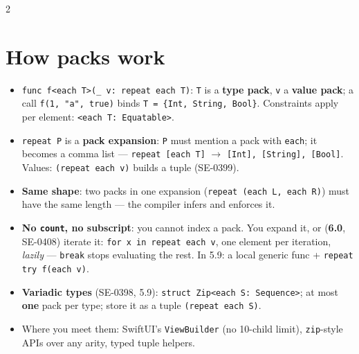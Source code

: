\documentclass[8pt]{extarticle}
\begin{document}



\begin{multicols}{2}
\raggedright

\section{How packs work}
\begin{itemize}
  \item \texttt{func f<each T>(\_ v: repeat each T)}: \texttt{T} is a
        \textbf{type pack}, \texttt{v} a \textbf{value pack}; a call
        \texttt{f(1, "a", true)} binds \texttt{T = \{Int, String, Bool\}}.
        Constraints apply per element: \texttt{<each T: Equatable>}.
  \item \texttt{repeat P} is a \textbf{pack expansion}: \texttt{P} must mention a
        pack with \texttt{each}; it becomes a comma list —
        \texttt{repeat [each T]} $\to$ \texttt{[Int], [String], [Bool]}.
        Values: \texttt{(repeat each v)} builds a tuple (SE-0399).
  \item \textbf{Same shape}: two packs in one expansion
        (\texttt{repeat (each L, each R)}) must have the same length — the
        compiler infers and enforces it.
  \item \textbf{No \texttt{count}, no subscript}: you cannot index a pack. You
        expand it, or (\textbf{6.0}, SE-0408) iterate it: \texttt{for x in repeat
        each v}, one element per iteration, \emph{lazily} — \texttt{break} stops
        evaluating the rest. In 5.9: a local generic func +
        \texttt{repeat try f(each v)}.
  \item \textbf{Variadic types} (SE-0398, 5.9): \texttt{struct Zip<each S:
        Sequence>}; at most \textbf{one} pack per type; store it as a tuple
        \texttt{(repeat each S)}.
  \item Where you meet them: SwiftUI's \texttt{ViewBuilder} (no 10-child
        limit), \texttt{zip}-style APIs over any arity, typed tuple helpers.
\end{itemize}


\end{multicols}
\end{document}
